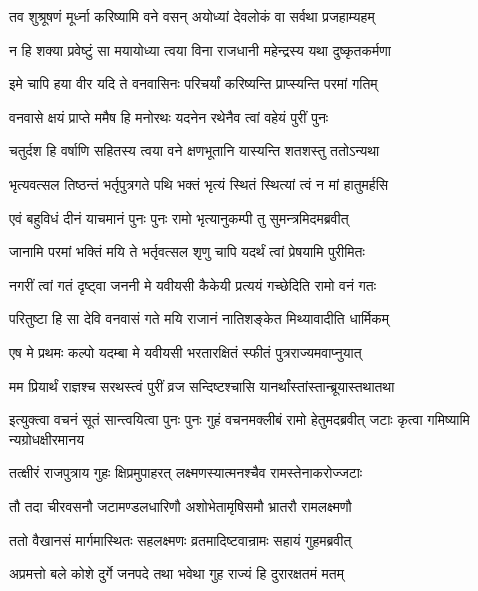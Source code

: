 \twolineshloka
{तव शुश्रूषणं मूर्ध्ना करिष्यामि वने वसन्}
{अयोध्यां देवलोकं वा सर्वथा प्रजहाम्यहम्} %

\twolineshloka
{न हि शक्या प्रवेष्टुं सा मयायोध्या त्वया विना}
{राजधानी महेन्द्रस्य यथा दुष्कृतकर्मणा} %

\twolineshloka
{इमे चापि हया वीर यदि ते वनवासिनः}
{परिचर्यां करिष्यन्ति प्राप्स्यन्ति परमां गतिम्} %

\twolineshloka
{वनवासे क्षयं प्राप्ते ममैष हि मनोरथः}
{यदनेन रथेनैव त्वां वहेयं पुरीं पुनः} %

\twolineshloka
{चतुर्दश हि वर्षाणि सहितस्य त्वया वने}
{क्षणभूतानि यास्यन्ति शतशस्तु ततोऽन्यथा} %

\twolineshloka
{भृत्यवत्सल तिष्ठन्तं भर्तृपुत्रगते पथि}
{भक्तं भृत्यं स्थितं स्थित्यां त्वं न मां हातुमर्हसि} %

\twolineshloka
{एवं बहुविधं दीनं याचमानं पुनः पुनः}
{रामो भृत्यानुकम्पी तु सुमन्त्रमिदमब्रवीत्} %

\twolineshloka
{जानामि परमां भक्तिं मयि ते भर्तृवत्सल}
{शृणु चापि यदर्थं त्वां प्रेषयामि पुरीमितः} %

\twolineshloka
{नगरीं त्वां गतं दृष्ट्वा जननी मे यवीयसी}
{कैकेयी प्रत्ययं गच्छेदिति रामो वनं गतः} %

\twolineshloka
{परितुष्टा हि सा देवि वनवासं गते मयि}
{राजानं नातिशङ्केत मिथ्यावादीति धार्मिकम्} %

\twolineshloka
{एष मे प्रथमः कल्पो यदम्बा मे यवीयसी}
{भरतारक्षितं स्फीतं पुत्रराज्यमवाप्नुयात्} %

\twolineshloka
{मम प्रियार्थं राज्ञश्च सरथस्त्वं पुरीं व्रज}
{सन्दिष्टश्चासि यानर्थांस्तांस्तान्ब्रूयास्तथातथा} %

\threelineshloka
{इत्युक्त्वा वचनं सूतं सान्त्वयित्वा पुनः पुनः}
{गुहं वचनमक्लीबं रामो हेतुमदब्रवीत्}
{जटाः कृत्वा गमिष्यामि न्यग्रोधक्षीरमानय} %

\twolineshloka
{तत्क्षीरं राजपुत्राय गुहः क्षिप्रमुपाहरत्}
{लक्ष्मणस्यात्मनश्चैव रामस्तेनाकरोज्जटाः} %

\twolineshloka
{तौ तदा चीरवसनौ जटामण्डलधारिणौ}
{अशोभेतामृषिसमौ भ्रातरौ रामलक्ष्मणौ} %

\twolineshloka
{ततो वैखानसं मार्गमास्थितः सहलक्ष्मणः}
{व्रतमादिष्टवान्रामः सहायं गुहमब्रवीत्} %

\twolineshloka
{अप्रमत्तो बले कोशे दुर्गे जनपदे तथा}
{भवेथा गुह राज्यं हि दुरारक्षतमं मतम्} %

